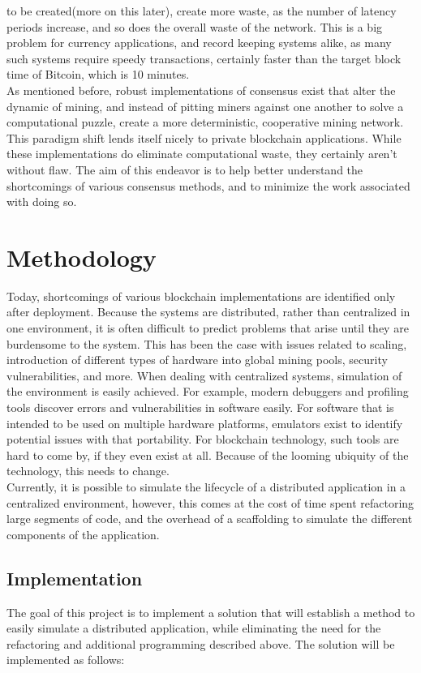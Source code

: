 \documentclass[11pt]{article}
\begin{document}
    to be created(more on this later), create more waste, as the number of latency periods increase, and so does the
    overall waste of the network.
    This is a big problem for currency applications, and record keeping systems alike, as many such systems require
    speedy transactions, certainly faster than the target block time of Bitcoin, which is 10 minutes.\\
    As mentioned before, robust implementations of consensus exist that alter the dynamic of mining, and instead of
    pitting miners against one another to solve a computational puzzle, create a more deterministic, cooperative mining
    network.
    This paradigm shift lends itself nicely to private blockchain applications.
    While these implementations do eliminate computational waste, they certainly aren't without flaw. %
    The aim of this endeavor is to help better understand the shortcomings of various consensus methods, and to minimize the
    work associated with doing so.
    \section{Methodology}
    Today, shortcomings of various blockchain implementations are identified only after deployment.
    Because the systems are distributed, rather than centralized in one environment, it is often difficult to predict
    problems that arise until they are burdensome to the system.
    This has been the case with issues related to scaling, introduction of different types of hardware into global
    mining pools, security vulnerabilities, and more. %
    When dealing with centralized systems, simulation of the environment is easily achieved.
    For example, modern debuggers and profiling tools discover errors and vulnerabilities in software easily.
    For software that is intended to be used on multiple hardware platforms, emulators exist to identify potential issues
    with that portability.
    For blockchain technology, such tools are hard to come by, if they even exist at all.
    Because of the looming ubiquity of the technology, this needs to change.\\
    Currently, it is possible to simulate the lifecycle of a distributed application in a centralized environment,
    however, this comes at the cost of time spent refactoring large segments of code, and the overhead of a scaffolding
    to simulate the different components of the application.
    \subsection{Implementation}
    The goal of this project is to implement a solution that will establish a method to easily simulate a distributed application,
    while eliminating the need for the refactoring and additional programming described above.
    The solution will be implemented as follows:
\end{document}
